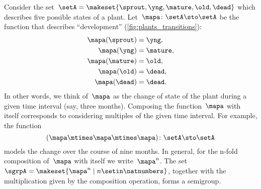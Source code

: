 \begin{example}
    \label{exa:plant-trafo-semigroup}
    Consider the set~$\setA = \makeset{ \sprout, \yng, \mature, \old, \dead }$ which describes five possible states of a plant.
    Let~$\mapa \colon \setA \sto \setA$ be the function that describes ``development'' (\cref{fig:plants_transitions}):
    \begin{align*}
        \mapa(\sprout) & =  \yng, \\
        \mapa(\yng)    & =  \mature, \\
        \mapa(\mature) & =  \old, \\
        \mapa( \old)   & = \dead, \\
        \mapa (\dead)  & = \dead.
    \end{align*}
    In other words, we think of~$\mapa$ as the change of state of the plant during a given time interval (say, three months).
    Composing the function~$\mapa$ with itself corresponds to considering multiples of the given time interval.
    For example, the function
    \begin{equation}
        (\mapa \mtimes \mapa \mtimes \mapa)
        \colon \setA \sto \setA
    \end{equation}
    models the change over the course of nine months.
    In general, for the n-fold composition of~$\mapa$ with itself we write~$\mapa^n$.
    The set~$\sgrpA = \makeset{ \mapa^n \mid n \setin \natnumbers }$, together with the multiplication given by the composition operation, forms a semigroup.
\end{example}
%
